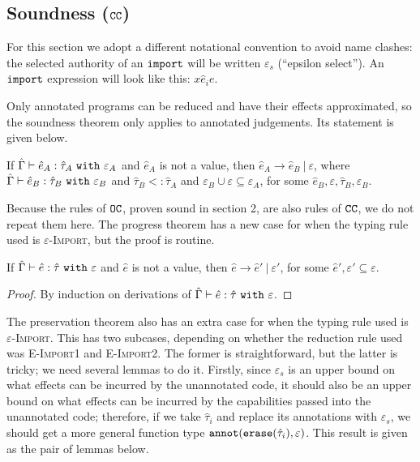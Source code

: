 \subsection{Soundness ($\mathtt{CC}$)} 

For this section we adopt a different notational convention to avoid name clashes: the selected authority of an $\mathtt{import}$ will be written $\varepsilon_{s}$ (``epsilon select''). An $\mathtt{import}$ expression will look like this: ${x}{\hat e_i}{e}$.

Only annotated programs can be reduced and have their effects approximated, so the soundness theorem only applies to annotated judgements. Its statement is given below.

\begin{theorem}
If $\hat \Gamma \vdash \hat e_A: \hat \tau_A~\mathtt{with}~ \varepsilon_A$ and $\hat e_A$ is not a value, then $\hat e_A \longrightarrow \hat e_B~|~\varepsilon$, where $\hat \Gamma \vdash \hat e_B: \hat \tau_B~\mathtt{with}~ \varepsilon_B$ and $\hat \tau_B <: \hat \tau_A$ and $\varepsilon_B \cup \varepsilon \subseteq \varepsilon_A$, for some $\hat e_B, \varepsilon, \hat \tau_B, \varepsilon_B$.
\end{theorem}

Because the rules of $\mathtt{OC}$, proven sound in section 2, are also rules of $\mathtt{CC}$, we do not repeat them here. The progress theorem has a new case for when the typing rule used is \textsc{$\varepsilon$-Import}, but the proof is routine.

\begin{theorem}
If $\hat \Gamma \vdash \hat e: \hat \tau~\mathtt{with}~ \varepsilon$ and $\hat e$ is not a value, then $\hat e \longrightarrow \hat e'~|~\varepsilon'$, for some $\hat e', \varepsilon' \subseteq \varepsilon$.
\end{theorem}

\begin{proof} By induction on derivations of $\hat \Gamma \vdash \hat e: \hat \tau~\mathtt{with}~ \varepsilon$.
\end{proof}

The preservation theorem also has an extra case for when the typing rule used is \textsc{$\varepsilon$-Import}. This has two subcases, depending on whether the reduction rule used was \textsc{E-Import1} and \textsc{E-Import2}. The former is straightforward, but the latter is tricky; we need several lemmas to do it. Firstly, since $\varepsilon_s$ is an upper bound on what effects can be incurred by the unannotated code, it should also be an upper bound on what effects can be incurred by the capabilities passed into the unannotated code; therefore, if we take $\hat \tau_i$ and replace its annotations with $\varepsilon_s$, we should get a more general function type $\mathtt{annot}(\mathtt{erase}(\hat \tau_i), \varepsilon)$. This result is given as the pair of lemmas below.

